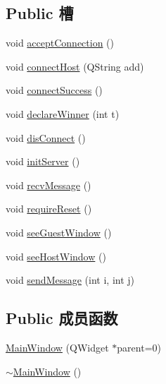 \subsection*{Public 槽}
\begin{DoxyCompactItemize}
\item 
void \hyperlink{class_main_window_ac24d6fd52a86d2f51570b4533faa5785_ac24d6fd52a86d2f51570b4533faa5785}{accept\+Connection} ()
\item 
void \hyperlink{class_main_window_a34b9342e6faff00c7d5c4c1ddfde6758_a34b9342e6faff00c7d5c4c1ddfde6758}{connect\+Host} (Q\+String add)
\item 
void \hyperlink{class_main_window_a818e9bdc274af691c4ebdbd255ede285_a818e9bdc274af691c4ebdbd255ede285}{connect\+Success} ()
\item 
void \hyperlink{class_main_window_abc7cfc8fb5680e5b2447d903174590ae_abc7cfc8fb5680e5b2447d903174590ae}{declare\+Winner} (int t)
\item 
void \hyperlink{class_main_window_a7ea49bac0b7604a1a4ba0dabb79b3439_a7ea49bac0b7604a1a4ba0dabb79b3439}{dis\+Connect} ()
\item 
void \hyperlink{class_main_window_a9343e215240dbbabcc2a9f83b1a53807_a9343e215240dbbabcc2a9f83b1a53807}{init\+Server} ()
\item 
void \hyperlink{class_main_window_a76637688e60dce665f72f661e1894412_a76637688e60dce665f72f661e1894412}{recv\+Message} ()
\item 
void \hyperlink{class_main_window_a939d1ea323f91e4a6e56e72ea3439803_a939d1ea323f91e4a6e56e72ea3439803}{require\+Reset} ()
\item 
void \hyperlink{class_main_window_a0b946fa967217fdf44022c00294f03b8_a0b946fa967217fdf44022c00294f03b8}{see\+Guest\+Window} ()
\item 
void \hyperlink{class_main_window_af89f09b9a2c59e4903d26b2bd1355052_af89f09b9a2c59e4903d26b2bd1355052}{see\+Host\+Window} ()
\item 
void \hyperlink{class_main_window_a6a0abf778996f6f2e3dc0d835d5f66ca_a6a0abf778996f6f2e3dc0d835d5f66ca}{send\+Message} (int i, int j)
\end{DoxyCompactItemize}
\subsection*{Public 成员函数}
\begin{DoxyCompactItemize}
\item 
\hyperlink{class_main_window_a8b244be8b7b7db1b08de2a2acb9409db_a8b244be8b7b7db1b08de2a2acb9409db}{Main\+Window} (Q\+Widget $\ast$parent=0)
\item 
\hyperlink{class_main_window_ae98d00a93bc118200eeef9f9bba1dba7_ae98d00a93bc118200eeef9f9bba1dba7}{$\sim$\+Main\+Window} ()
\end{DoxyCompactItemize}
